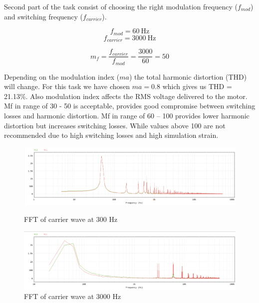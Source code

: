\documentclass[12pt,a4paper]{report}
\begin{document}
Second part of the task consist of choosing the right modulation frequency ($f_{mod}$) and switching frequency ($f_{carrier}$).

\begin{equation}
    f_{mod} = 60~\text{Hz}
\end{equation}
\begin{equation}
    f_{carrier} = 3000~\text{Hz}
\end{equation}

\begin{equation}
    m_{f} = \frac{f_{carrier}}{f_{mod}} = \frac{3000}{60} = 50
\end{equation}

Depending on the modulation index ($ma$) the total harmonic distortion (THD) will change. For this task we have chosen $ma = 0.8$ which gives us THD = 21.13\%.
Also modulation index affects the RMS voltage delivered to the motor. Mf in range of 30 - 50 is acceptable, provides good compromise between switching losses and harmonic distortion.
Mf in range of 60 -- 100 provides lower harmonic distortion but increases switching losses. While values above 100 are not recommended due to high switching losses and high simulation strain.

\begin{figure}[H]
    \centering
    \begin{minipage}{0.48\textwidth}
        \centering
        \includegraphics[width=\linewidth]{fft300hz.png}
        \caption{FFT of carrier wave at 300 Hz}
        \label{fig:fft300hz}
    \end{minipage}\hfill
    \begin{minipage}{0.48\textwidth}
        \centering
        \includegraphics[width=\linewidth]{fft3000hz.png}
        \caption{FFT of carrier wave at 3000 Hz}
        \label{fig:fft3000hz}
    \end{minipage}
\end{figure}
\newpage
\end{document}

